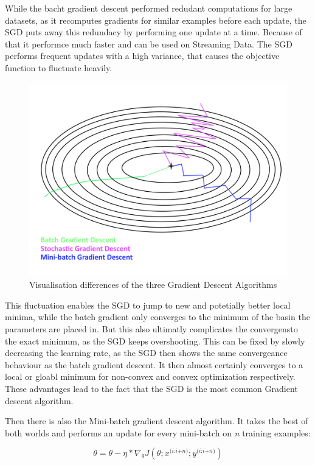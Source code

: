 \documentclass[12pt,oneside,a4paper,parskip]{scrbook}
\begin{document}
While the bacht gradient descent performed redudant computations for large datasets, as it recomputes gradients for similar examples 
before each update, the SGD puts away this redundacy by performing one update at a time. Because of that it performce much faster and 
can be used on Streaming Data.
The SGD performs frequent updates with a high variance, that causes the objective function to fluctuate heavily. 

\begin{figure}
  \centering
  \includegraphics[width=0.7\columnwidth]{Gradient_desc_types}
  \caption{Visualisation differences of the three Gradient Descent Algorithms}
  \label{fig:comp_GD}
\end{figure}

This fluctuation enables the SGD to jump to new and potetially better local minima, while the batch gradient only converges 
to the minimum of the basin the parameters are placed in. But this also ultimatly complicates the convergensto the exact minimum, 
as the SGD keeps overshooting. This can be fixed by slowly decreasing the learning rate, as the SGD then shows the same 
convergeance behaviour as the batch gradient descent. It then almost certainly converges to a local or gloabl minimum for
non-convex and convex optimization respectively. \cite{overvieDiffRSLVQ}
These advantages lead to the fact that the SGD is the most common Gradient descent algorithm.

Then there is also the Mini-batch gradient descent algorithm. It takes the best of both worlds and performs an update for
every mini-batch on \textit{n} training examples:

\begin{equation}
\theta = \theta - \eta * \nabla_\theta \textit{J}(\theta;\textit{x}^\textit{(i:i+n)};\textit{y}^\textit{(i:i+n)})
\end{equation}
\end{document}
